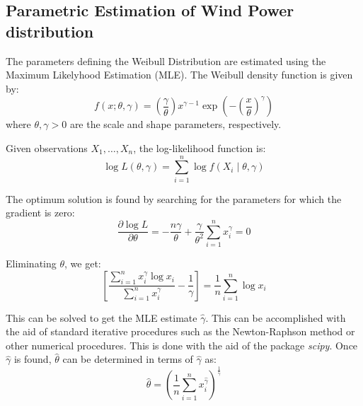 
\subsection{Parametric Estimation of Wind Power distribution}\label{subsection: weib estim}

The parameters defining the Weibull Distribution are estimated using the Maximum Likelyhood Estimation (MLE). 
The Weibull density function is given by:
\begin{equation}
f(x; \theta, \gamma) = \left(\frac{\gamma}{\theta}\right)x^{\gamma-1}\exp\left(-\left(\frac{x}{\theta}\right)^\gamma\right)
\end{equation}
where \(\theta, \gamma > 0\) are the scale and shape parameters, respectively. 

Given observations \(X_1, \ldots, X_n\), the log-likelihood function is:
\begin{equation}
\log L(\theta, \gamma) = \sum_{i=1}^n \log f(X_i \mid \theta, \gamma)
\end{equation}

The optimum solution is found by searching for the parameters for which the gradient is zero:
\begin{equation}
\frac{\partial \log L}{\partial \theta} = -\frac{n \gamma}{\theta} + \frac{\gamma}{\theta^2} \sum_{i=1}^{n} x_i^\gamma = 0
\end{equation}

Eliminating $\theta$, we get:
\begin{equation}
\left[ \frac{\sum_{i=1}^{n} x_i^\gamma \log x_i}{\sum_{i=1}^{n} x_i^\gamma} - \frac{1}{\gamma} \right] = \frac{1}{n} \sum_{i=1}^{n} \log x_i
\end{equation}

This can be solved to get the MLE estimate $\hat{\gamma}$. 
This can be accomplished with the aid of standard iterative procedures such as the Newton-Raphson method or other numerical procedures. 
This is done with the aid of the package \emph{scipy}.
Once $\hat{\gamma}$ is found, $\hat{\theta}$ can be determined in terms of $\hat{\gamma}$ as:
\begin{equation}
\hat{\theta} = \left( \frac{1}{n} \sum_{i=1}^{n} x_i^{\hat{\gamma}} \right)^{\frac{1}{\hat{\gamma}}}
\end{equation}



